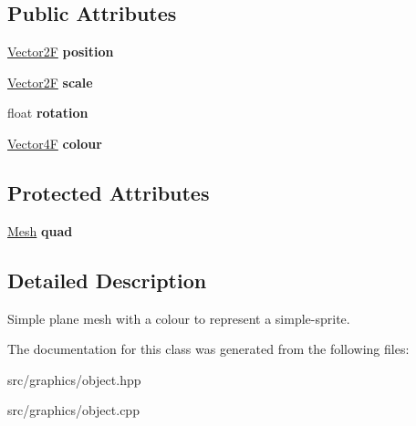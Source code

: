 \subsection*{Public Attributes}
\begin{DoxyCompactItemize}
\item 
\mbox{\label{class_object2_d_a93ebae14cceff7ad9aaf0086c7aefb0b}} 
\mbox{\hyperlink{class_vector2}{Vector2F}} {\bfseries position}
\item 
\mbox{\label{class_object2_d_adec86c792f1497768570792078c35bc2}} 
\mbox{\hyperlink{class_vector2}{Vector2F}} {\bfseries scale}
\item 
\mbox{\label{class_object2_d_a757b9c0a38f349c8057821dbe2bd14ab}} 
float {\bfseries rotation}
\item 
\mbox{\label{class_object2_d_a27ed9bb852339b71f61a7f79d36dae86}} 
\mbox{\hyperlink{class_vector4}{Vector4F}} {\bfseries colour}
\end{DoxyCompactItemize}
\subsection*{Protected Attributes}
\begin{DoxyCompactItemize}
\item 
\mbox{\label{class_object2_d_a7a6d4867eecdb4342b178c9625b4cd67}} 
\mbox{\hyperlink{class_mesh}{Mesh}} {\bfseries quad}
\end{DoxyCompactItemize}


\subsection{Detailed Description}
Simple plane mesh with a colour to represent a simple-\/sprite. 

The documentation for this class was generated from the following files\+:\begin{DoxyCompactItemize}
\item 
src/graphics/object.\+hpp\item 
src/graphics/object.\+cpp\end{DoxyCompactItemize}
